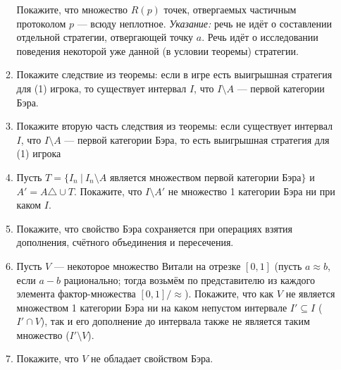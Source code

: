 \documentclass[10pt,a4paper,oneside]{article}
\begin{document}
\begin{enumerate}
\begin{enumerate}
Покажите, что множество $R(p)$ точек, отвергаемых частичным протоколом $p$ --- всюду неплотное.
\emph{Указание:} речь не идёт о составлении отдельной стратегии, отвергающей точку $a$. Речь идёт о исследовании поведения
некоторой уже данной (в условии теоремы) стратегии.
\item Покажите следствие из теоремы: если в игре есть выигрышная стратегия для (1) игрока, то существует интервал $I$,
что $I \setminus A$ --- первой категории Бэра.
\item Покажите вторую часть следствия из теоремы: если существует интервал $I$, что $I \setminus A$ --- первой категории Бэра,
то есть выигрышная стратегия для (1) игрока
\item Пусть $T = \{I_n \ |\ I_n \setminus A \text{ является множеством первой категории Бэра}\}$ и $A' = A \triangle \cup T$. Покажите, что 
$I \setminus A'$ не множество 1 категории Бэра ни при каком $I$.
\item Покажите, что свойство Бэра сохраняется при операциях взятия дополнения, счётного объединения и пересечения.
\item Пусть $V$ --- некоторое множество Витали на отрезке $[0,1]$ (пусть $a\approx b$, если $a-b$ рационально;
тогда возьмём по представителю из каждого элемента фактор-множества $[0,1]/\approx$). Покажите, что как $V$ не является
множеством 1 категории Бэра ни на каком непустом интервале $I' \subseteq I$ ($I' \cap V$), так и его дополнение до 
интервала также не является таким множество ($I' \setminus V$).
\item Покажите, что $V$ не обладает свойством Бэра.
\end{enumerate}
\end{enumerate}
\end{document}
